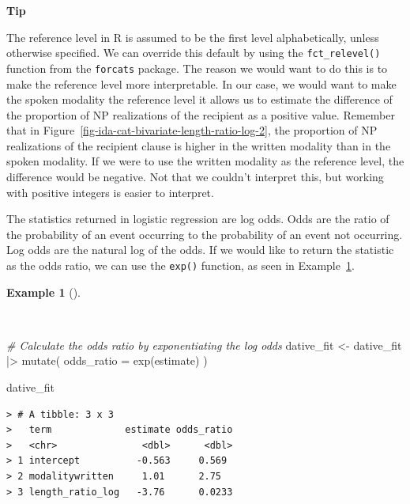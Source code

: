 \documentclass[
  letterpaper,
  DIV=11,
  numbers=noendperiod]{scrreprt}
\newenvironment{Shaded}{\begin{snugshade}}{\end{snugshade}}
\newcommand{\AttributeTok}[1]{\textcolor[rgb]{0.00,0.00,0.00}{#1}}
\newcommand{\CommentTok}[1]{\textcolor[rgb]{0.00,0.00,0.00}{\textit{#1}}}
\newcommand{\FunctionTok}[1]{\textcolor[rgb]{0.00,0.00,0.00}{#1}}
\newcommand{\NormalTok}[1]{\textcolor[rgb]{0.00,0.00,0.00}{#1}}
\newcommand{\OtherTok}[1]{\textcolor[rgb]{0.00,0.00,0.00}{#1}}
\newcommand{\SpecialCharTok}[1]{\textcolor[rgb]{0.00,0.00,0.00}{#1}}
\theoremstyle{definition}
\newtheorem{example}{Example}[chapter]
\theoremstyle{remark}
\begin{document}
\begin{tcolorbox}[enhanced jigsaw, leftrule=.75mm, colframe=quarto-callout-color-frame, colback=white, rightrule=.15mm, opacityback=0, arc=.35mm, breakable, bottomrule=.15mm, left=2mm, toprule=.15mm]

\textbf{ Tip}

The reference level in R is assumed to be the first level
alphabetically, unless otherwise specified. We can override this default
by using the \texttt{fct\_relevel()} function from the \texttt{forcats}
package. The reason we would want to do this is to make the reference
level more interpretable. In our case, we would want to make the spoken
modality the reference level it allows us to estimate the difference of
the proportion of NP realizations of the recipient as a positive value.
Remember that in Figure~\ref{fig-ida-cat-bivariate-length-ratio-log-2},
the proportion of NP realizations of the recipient clause is higher in
the written modality than in the spoken modality. If we were to use the
written modality as the reference level, the difference would be
negative. Not that we couldn't interpret this, but working with positive
integers is easier to interpret.

\end{tcolorbox}

The statistics returned in logistic regression are log odds. Odds are
the ratio of the probability of an event occurring to the probability of
an event not occurring. Log odds are the natural log of the odds. If we
would like to return the statistic as the odds ratio, we can use the
\texttt{exp()} function, as seen in
Example~\ref{exm-ida-cat-logistic-regression-odds-ratio}.

\begin{example}[]\protect\hypertarget{exm-ida-cat-logistic-regression-odds-ratio}{}\label{exm-ida-cat-logistic-regression-odds-ratio}

~

\begin{Shaded}
\begin{Highlighting}[]
\CommentTok{\# Calculate the odds ratio by exponentiating the log odds}
\NormalTok{dative\_fit }\OtherTok{\textless{}{-}}
\NormalTok{  dative\_fit }\SpecialCharTok{|\textgreater{}}
  \FunctionTok{mutate}\NormalTok{(}
    \AttributeTok{odds\_ratio =} \FunctionTok{exp}\NormalTok{(estimate)}
\NormalTok{  )}

\NormalTok{dative\_fit}
\end{Highlighting}
\end{Shaded}

\begin{verbatim}
> # A tibble: 3 x 3
>   term             estimate odds_ratio
>   <chr>               <dbl>      <dbl>
> 1 intercept          -0.563     0.569 
> 2 modalitywritten     1.01      2.75  
> 3 length_ratio_log   -3.76      0.0233
\end{verbatim}

\end{example}
\end{document}
